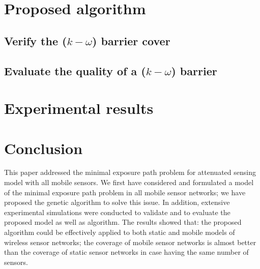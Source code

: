 \documentclass[3p]{elsarticle}
\begin{document}
\section{Proposed algorithm}
\subsection{Verify the ($k-\omega$) barrier cover}


\subsection{Evaluate the quality of a ($k-\omega$) barrier}
\label{baCal}


\section{Experimental results}


\section{Conclusion}
%
This paper addressed the minimal exposure path problem for attenuated sensing model with all mobile sensors. We first have considered and formulated a model of the minimal exposure path problem in all mobile sensor networks; we have proposed the genetic algorithm to solve this issue. In addition, extensive experimental simulations were conducted to validate and to evaluate the proposed model as well as algorithm. The results showed that: the proposed algorithm could be effectively applied to both static and mobile models of wireless sensor networks; the coverage of mobile sensor networks is almost better than the coverage of static sensor networks in case having the same number of sensors.

%


\end{document}
